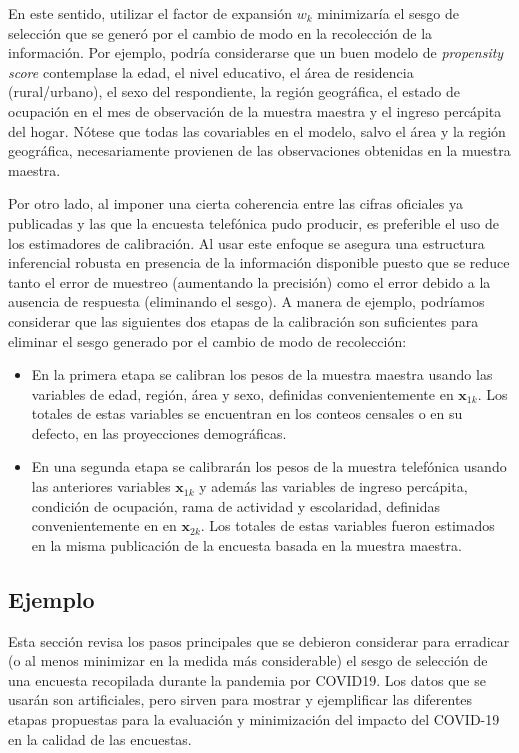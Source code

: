 \documentclass[
  12pt,
  spanish,
]{book}
\providecommand{\tightlist}{%
  \setlength{\itemsep}{0pt}\setlength{\parskip}{0pt}}
\begin{document}
En este sentido, utilizar el factor de expansión \(w_k\) minimizaría el sesgo de selección que se generó por el cambio de modo en la recolección de la información. Por ejemplo, podría considerarse que un buen modelo de \emph{propensity score} contemplase la edad, el nivel educativo, el área de residencia (rural/urbano), el sexo del respondiente, la región geográfica, el estado de ocupación en el mes de observación de la muestra maestra y el ingreso percápita del hogar. Nótese que todas las covariables en el modelo, salvo el área y la región geográfica, necesariamente provienen de las observaciones obtenidas en la muestra maestra.

Por otro lado, al imponer una cierta coherencia entre las cifras oficiales ya publicadas y las que la encuesta telefónica pudo producir, es preferible el uso de los estimadores de calibración. Al usar este enfoque se asegura una estructura inferencial robusta en presencia de la información disponible puesto que se reduce tanto el error de muestreo (aumentando la precisión) como el error debido a la ausencia de respuesta (eliminando el sesgo). A manera de ejemplo, podríamos considerar que las siguientes dos etapas de la calibración son suficientes para eliminar el sesgo generado por el cambio de modo de recolección:

\begin{itemize}
\tightlist
\item
  En la primera etapa se calibran los pesos de la muestra maestra usando las variables de edad, región, área y sexo, definidas convenientemente en \(\boldsymbol{x}_{1k}\). Los totales de estas variables se encuentran en los conteos censales o en su defecto, en las proyecciones demográficas.
\item
  En una segunda etapa se calibrarán los pesos de la muestra telefónica usando las anteriores variables \(\boldsymbol{x}_{1k}\) y además las variables de ingreso percápita, condición de ocupación, rama de actividad y escolaridad, definidas convenientemente en en \(\boldsymbol{x}_{2k}\). Los totales de estas variables fueron estimados en la misma publicación de la encuesta basada en la muestra maestra.
\end{itemize}

\hypertarget{ejemplo}{%
\subsection{Ejemplo}\label{ejemplo}}

Esta sección revisa los pasos principales que se debieron considerar para erradicar (o al menos minimizar en la medida más considerable) el sesgo de selección de una encuesta recopilada durante la pandemia por COVID19. Los datos que se usarán son artificiales, pero sirven para mostrar y ejemplificar las diferentes etapas propuestas para la evaluación y minimización del impacto del COVID-19 en la calidad de las encuestas.
\end{document}
